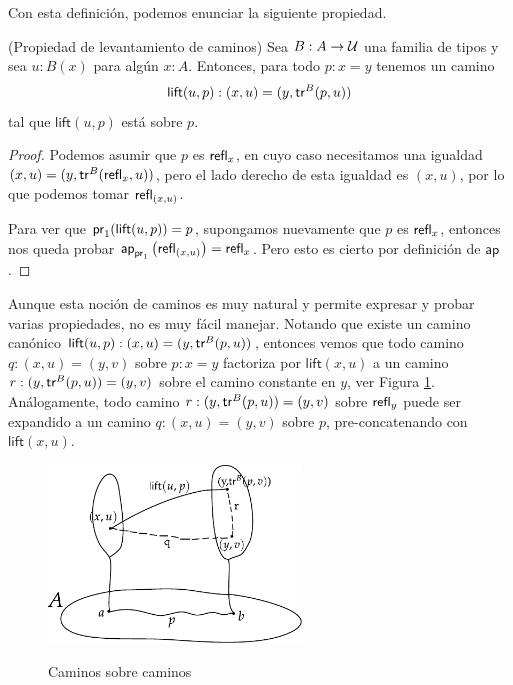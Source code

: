 \documentclass[../main.tex]{subfiles}
\begin{document}
Con esta definici\'on, podemos enunciar la siguiente propiedad.

\begin{lemma}(Propiedad de levantamiento de caminos)\label{path-lift}
  Sea $B:A\to \mathcal{U}$ una familia de tipos y sea $u:B(x)$ para alg\'un $x:A$. Entonces, para todo $p:x=y$ tenemos un camino
  \[ \mathsf{lift}(u,p): (x,u) = (y, \mathsf{tr}^{B}(p,u)) \]
  tal que $\mathsf{lift}(u,p)$ est\'a sobre $p$.
\end{lemma}
\begin{proof}
  Podemos asumir que $p$ es $\mathsf{refl}_{x}$, en cuyo caso necesitamos una igualdad $(x,u)=(y,{\mathsf{tr}^{B}(\mathsf{refl}_{x},u)})$, pero el lado derecho de esta igualdad es $(x,u)$, por lo que podemos tomar $\mathsf{refl}_{(x,u)}$.

  Para ver que $\mathsf{pr}_{1}(\mathsf{lift}(u,p))=p$, supongamos nuevamente que $p$ es $\mathsf{refl}_{x}$, entonces nos queda probar $\mathsf{ap}_{\mathsf{pr}_{1}} \left(\mathsf{refl}_{(x,u)}\right)=\mathsf{refl}_{x}$. Pero esto es cierto por definición de $\mathsf{ap}$.
\end{proof}

Aunque esta noci\'on de caminos es muy natural y permite expresar y probar varias propiedades, no es muy f\'acil manejar.
Notando que existe un camino can\'onico $\mathsf{lift}(u,p):(x,u) = (y, \mathsf{tr}^{B}(p,u))$, entonces vemos que todo camino $q:(x,u)=(y,v)$ sobre $p:x=y$ factoriza por $\mathsf{lift}(x,u)$ a un camino $r:(y , \mathsf{tr}^{B}(p,u))=(y,v)$ sobre el camino constante en $y$, ver Figura \ref{caminos-sobre}.
An\'alogamente, todo camino $r:(y , \mathsf{tr}^{B}(p,u))=(y,v)$ sobre $\mathsf{refl}_{y}$ puede ser expandido a un camino $q:(x,u)=(y,v)$ sobre $p$, pre-concatenando con $\mathsf{lift}(x,u)$.

\begin{figure}[h]
  \caption{Caminos sobre caminos}
  \centering
  \vspace{1em}
  \includegraphics[width=0.6\textwidth]{images/caminoslevantados}
  \label{caminos-sobre}
\end{figure}
\end{document}
